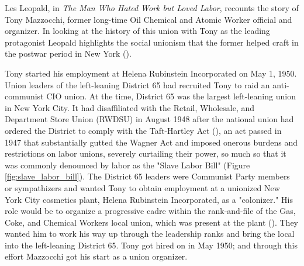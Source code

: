 \documentclass[12pt]{article}
\begin{document}
Les Leopald, in \textit{The Man Who Hated Work but Loved Labor}, recounts the story of Tony Mazzocchi, former long-time Oil Chemical and Atomic Worker official and organizer. In looking at the history of this union with Tony as the leading protagonist Leopald highlights the social unionism that the former helped craft in the postwar period in New York (\cite[16]{leopoldManWhoHated2007}).

Tony started his employment at Helena Rubinstein Incorporated on May 1, 1950. Union leaders of the left-leaning District 65 had recruited Tony to raid an anti-communist CIO union. At the time, District 65 was the largest left-leaning union in New York City. It had disaffiliated with the Retail, Wholesale, and Department Store Union (RWDSU) in August 1948 after the national union had ordered the District to comply with the Taft-Hartley Act (\cite{leopoldManWhoHated2007}), an act passed in 1947 that substantially gutted the Wagner Act and imposed onerous burdens and restrictions on labor unions, severely curtailing their power, so much so that it was commonly denounced by labor as the "Slave Labor Bill" (Figure \ref{fig:slave_labor_bill}). The District 65 leaders were Communist Party members or sympathizers and wanted Tony to obtain employment at a unionized New York City cosmetics plant, Helena Rubinstein Incorporated, as a "colonizer." His role would be to organize a progressive cadre within the rank-and-file of the Gas, Coke, and Chemical Workers local union, which was present at the plant (\cite[71]{leopoldManWhoHated2007}). They wanted him to work his way up through the leadership ranks and bring the local into the left-leaning District 65. Tony got hired on in May 1950; and through this effort Mazzocchi got his start as a union organizer.
\end{document}
